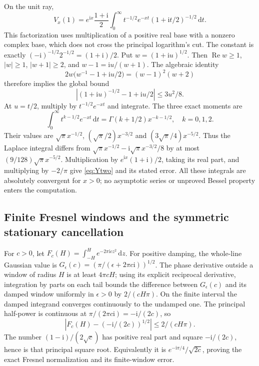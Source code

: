 \documentclass[11pt,a4paper]{article}
\numberwithin{equation}{section}
\theoremstyle{definition}
\newcommand{\dd}{\,\mathrm d}
\newcommand{\ii}{\mathrm i}
\newcommand{\Rea}{\operatorname{Re}}
\begin{document}
On the unit ray,
\[
 V_x(1)=e^{\ii x}\frac{1+\ii}{2}
       \int_0^\infty t^{-1/2}e^{-xt}(1+\ii t/2)^{-1/2}\dd t.
\]
This factorization uses multiplication of a positive real base with a
nonzero complex base, which does not cross the principal logarithm's cut.
The constant is exactly $(-\ii)^{-1/2}2^{-1/2}=(1+\ii)/2$.
Put $w=(1+\ii u)^{1/2}$. Then
$\Rea w\ge1$, $|w|\ge1$, $|w+1|\ge2$, and
$w-1=\ii u/(w+1)$. The algebraic identity
\[
 2w\bigl(w^{-1}-1+\ii u/2\bigr)=(w-1)^2(w+2)
\]
therefore implies the global bound
\[
 |(1+\ii u)^{-1/2}-1+\ii u/2|\le3u^2/8.
\]
At $u=t/2$, multiply by $t^{-1/2}e^{-xt}$ and integrate.
The three exact moments are
\[
 \int_0^\infty t^{k-1/2}e^{-xt}\dd t
    =\Gamma(k+1/2)x^{-k-1/2},\quad k=0,1,2.
\]
Their values are $\sqrt\pi x^{-1/2}$,
$(\sqrt\pi/2)x^{-3/2}$ and $(3\sqrt\pi/4)x^{-5/2}$.
Thus the Laplace integral differs from
$\sqrt\pi x^{-1/2}-\ii\sqrt\pi x^{-3/2}/8$ by at most
$(9/128)\sqrt\pi x^{-5/2}$.
Multiplication by $e^{\ii x}(1+\ii)/2$, taking its real part, and multiplying
by $-2/\pi$ give \eqref{eq:Ytwo} and its stated error. All these integrals
are absolutely convergent for $x>0$; no asymptotic series or unproved Bessel
property enters the computation.

\subsection{Finite Fresnel windows and the symmetric stationary cancellation}
For $c>0$, let
$F_c(H)=\int_{-H}^H e^{-2\pi\ii cz^2}\dd z$.
For positive damping, the whole-line Gaussian value is
$G_\epsilon(c)=(\pi/(\epsilon+2\pi c\ii))^{1/2}$.
The phase derivative outside a window of radius $H$ is at least $4\pi cH$;
using its explicit reciprocal derivative, integration by parts on each tail
bounds the difference between $G_\epsilon(c)$ and its damped window uniformly
in $\epsilon>0$ by $2/(cH\pi)$.
On the finite interval the damped integrand converges continuously to the
undamped one. The principal half-power is continuous at
$\pi/(2\pi c\ii)=-\ii/(2c)$, so
\[
 |F_c(H)-(-\ii/(2c))^{1/2}|\le2/(cH\pi).
\]
The number $(1-\ii)/(2\sqrt c)$ has positive real part and square
$-\ii/(2c)$, hence is that principal square root. Equivalently it is
$e^{-\ii\pi/4}/\sqrt{2c}$, proving the exact Fresnel normalization and its
finite-window error.
\end{document}
